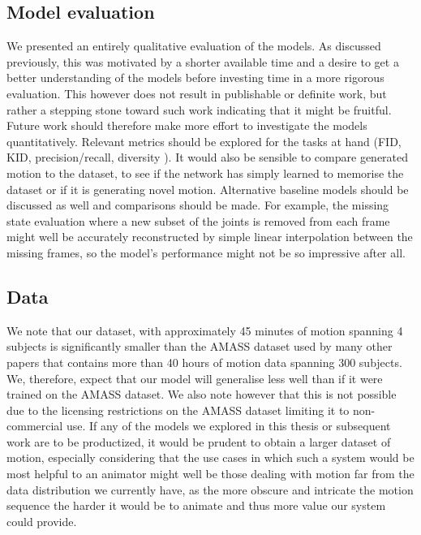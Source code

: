 
\subsection{Model evaluation}
\label{sec:future_work_evaluation}

We presented an entirely qualitative evaluation of the models. As discussed previously, this was motivated by a shorter available time and a desire to get a better understanding of the models before investing time in a more rigorous evaluation. This however does not result in publishable or definite work, but rather a stepping stone toward such work indicating that it might be fruitful. Future work should therefore make more effort to investigate the models quantitatively. Relevant metrics should be explored for the tasks at hand (FID, KID, precision/recall, diversity \cite{Paper_with_useful_metrics_cited_by_MDM}). It would also be sensible to compare generated motion to the dataset, to see if the network has simply learned to memorise the dataset or if it is generating novel motion. Alternative baseline models should be discussed as well and comparisons should be made. For example, the missing state evaluation where a new subset of the joints is removed from each frame might well be accurately reconstructed by simple linear interpolation between the missing frames, so the model's performance might not be so impressive after all.


\subsection{Data}
We note that our dataset, with approximately 45 minutes of motion spanning 4 subjects is significantly smaller than the AMASS \cite{amass} dataset used by many other papers that contains more than 40 hours of motion data spanning 300 subjects. We, therefore, expect that our model will generalise less well than if it were trained on the AMASS dataset. We also note however that this is not possible due to the licensing restrictions on the AMASS dataset limiting it to non-commercial use. If any of the models we explored in this thesis or subsequent work are to be productized, it would be prudent to obtain a larger dataset of motion, especially considering that the use cases in which such a system would be most helpful to an animator might well be those dealing with motion far from the data distribution we currently have, as the more obscure and intricate the motion sequence the harder it would be to animate and thus more value our system could provide.